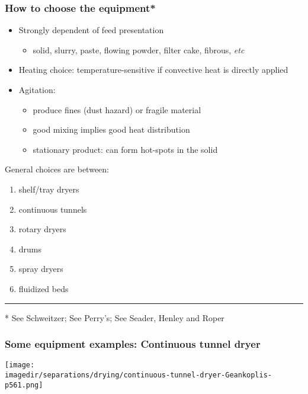 \begin{frame}\frametitle{How to choose the equipment*}
	\begin{itemize}
		\item	Strongly dependent of feed presentation
		\begin{itemize}
			\item	solid, slurry, paste, flowing powder, filter cake, fibrous, \emph{etc}
		\end{itemize}
		\item	Heating choice: temperature-sensitive if convective heat is directly applied
		\item	Agitation:
		\begin{itemize}
			\item	produce fines (dust hazard) or fragile material
			\item	good mixing implies good heat distribution
			\item	stationary product: can form hot-spots in the solid
		\end{itemize}
	\end{itemize}

	General choices are between:
	\begin{enumerate}
		\item	shelf/tray dryers
		\item	continuous tunnels
		\item	rotary dryers
		\item	drums
		\item	spray dryers
		\item	fluidized beds
	\end{enumerate}
	\vspace{4pt}
	\hrule
	\vspace{4pt}
	* See Schweitzer; See Perry's; See Seader, Henley and Roper
\end{frame}

\begin{frame}\frametitle{Some equipment examples: Continuous tunnel dryer}
	\begin{center}
		\texttt{[image: \\imagedir/separations/drying/continuous-tunnel-dryer-Geankoplis-p561.png]}
	\end{center}
	\vspace{-12pt}
\end{frame}

